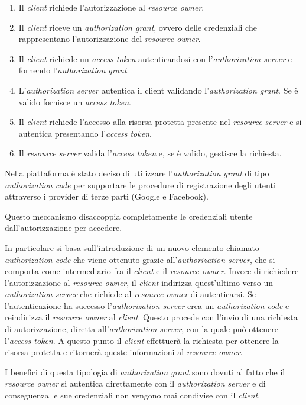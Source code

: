 \begin{enumerate}
    \item Il \textit{client} richiede l'autorizzazione al \textit{resource owner}.
    \item Il \textit{client} riceve un \textit{authorization grant}, ovvero delle credenziali che rappresentano l'autorizzazione del \textit{resource owner}.
    \item Il \textit{client} richiede un \textit{access token} autenticandosi con l'\textit{authorization server} e fornendo l'\textit{authorization grant}.
    \item L'\textit{authorization server} autentica il client validando l'\textit{authorization grant}. Se è valido fornisce un \textit{access token}.
    \item Il \textit{client} richiede l'accesso alla risorsa protetta presente nel \textit{resource server} e si autentica presentando l'\textit{access token}.
    \item Il \textit{resource server} valida l'\textit{access token} e, se è valido, gestisce la richiesta.
\end{enumerate}

Nella piattaforma è stato deciso di utilizzare l'\textit{authorization grant} di tipo \textit{authorization code} per supportare le procedure
di registrazione degli utenti attraverso i provider di terze parti (Google e Facebook).

Questo meccanismo disaccoppia completamente le credenziali utente dall'autorizzazione per accedere.

In particolare si basa sull'introduzione di un nuovo elemento chiamato \textit{authorization code}
che viene ottenuto grazie all'\textit{authorization server}, che si comporta come intermediario fra il  \textit{client} e il \textit{resource owner}.
Invece di richiedere l'autorizzazione al \textit{resource owner}, il \textit{client} indirizza quest'ultimo verso un \textit{authorization server} che richiede al \textit{resource owner} di autenticarsi.
Se l'autenticazione ha successo l'\textit{authorization server} crea un \textit{authorization code} e reindirizza il \textit{resource owner} al \textit{client}.
Questo procede con l'invio di una richiesta di autorizzazione, diretta all'\textit{authorization server}, con la quale può ottenere l'\textit{access token}.
A questo punto il \textit{client} effettuerà la richiesta per ottenere la risorsa protetta e ritornerà queste informazioni al \textit{resource owner}.

I benefici di questa tipologia di \textit{authorization grant} sono dovuti al fatto che il \textit{resource owner} si autentica direttamente con il \textit{authorization server}
e di conseguenza le sue credenziali non vengono mai condivise con il \textit{client}.

